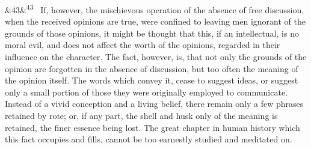 \documentclass[12pt]{article}
\newcommand{\para}[1][]{\par\noindent\ifx&#1&\else\textsuperscript{\footnotesize #1}~\fi}
\begin{document}
\para[43] If, however, the mischievous operation of the absence of free discussion, when the received opinions are true, were confined to leaving men ignorant of the grounds of those opinions, it might be thought that this, if an intellectual, is no moral evil, and does not affect the worth of the opinions, regarded in their influence on the character. The fact, however, is, that not only the grounds of the opinion are forgotten in the absence of discussion, but too often the meaning of the opinion itself. The words which convey it, cease to suggest ideas, or suggest only a small portion of those they were originally employed to communicate. Instead of a vivid conception and a living belief, there remain only a few phrases retained by rote; or, if any part, the shell and husk only of the meaning is retained, the finer essence being lost. The great chapter in human history which this fact occupies and fills, cannot be too earnestly studied and meditated on.
\end{document}

